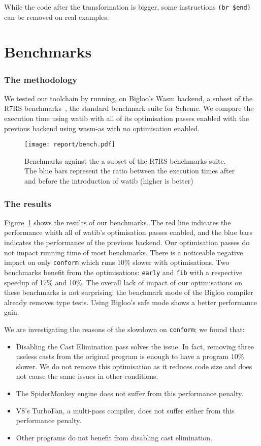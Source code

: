 \documentclass[a4paper,11pt]{article}
\begin{document}
While the code after the transformation is bigger, some instructions \texttt{(br
  \$end)} can be removed on real examples.

\section{Benchmarks}\label{bench}
\subsubsection{The methodology}
We tested our toolchain by running, on Bigloo's Wasm backend, a subset of the
R7RS benchmarks~\cite{r7rsbench}, the standard benchmark suite for Scheme. We
compare the execution time using \textsf{watib} with all of its optimisation
passes enabled with the previous backend using \textsf{wasm-as} with no
optimisation enabled.
\begin{figure}[h!]
  \texttt{[image: report/bench.pdf]}
  \caption{Benchmarks against the a subset of the R7RS benchmarks suite. The
    blue bars represent the ratio between the execution times after and before
    the introduction of \textsf{watib} (higher is better)}\label{r7rs}
\end{figure}
\subsubsection{The results}
Figure~\ref{r7rs} shows the results of our benchmarks. The red line indicates
the performance whith all of \textsf{watib}'s optimisation passes enabled,
and the blue bars indicates the performance of the previous backend. Our
optimisation passes do not impact running time of most benchmarks. There is a
noticeable negative impact on only \texttt{conform} which runs 10\% slower with
optimisations. Two benchmarks benefit from the optimisations: \texttt{early} and
\texttt{fib} with a respective speedup of 17\% and 10\%. The overall lack of
impact of our optimisations on these benchmarks is not surprising: the benchmark
mode of the Bigloo compiler already removes type tests. Using Bigloo's safe mode
shows a better performance gain.

We are investigating the reasons of the slowdown on \texttt{conform}; we found
that:
\begin{itemize}
  \item Disabling the Cast Elimination pass solves the issue. In fact, removing
    three useless casts from the original program is enough to have a program
    10\% slower. We do not remove this optimisation as it reduces code size and
    does not cause the same issues in other conditions.
  \item The SpiderMonkey engine does not suffer from this performance penalty.
  \item V8's TurboFan, a multi-pass compiler, does not suffer either from this
    performance penalty.
  \item Other programs do not benefit from disabling cast elimination.
\end{itemize}
\end{document}
